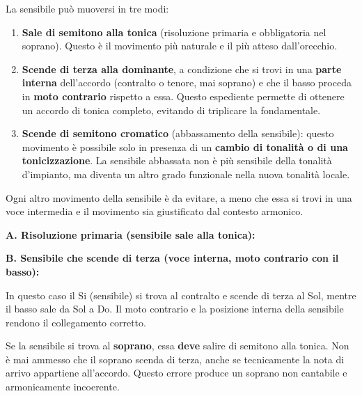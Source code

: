 \begin{regola}
	\label{reg:tre_movimenti_sensibile}
	La sensibile può muoversi in tre modi:
	\begin{enumerate}
		\item \textbf{Sale di semitono alla tonica} (risoluzione primaria e obbligatoria nel soprano). Questo è il movimento più naturale e il più atteso dall'orecchio.
		\item \textbf{Scende di terza alla dominante}, a condizione che si trovi in una \textbf{parte interna} dell'accordo (contralto o tenore, mai soprano) e che il basso proceda in \textbf{moto contrario} rispetto a essa. Questo espediente permette di ottenere un accordo di tonica completo, evitando di triplicare la fondamentale.
		\item \textbf{Scende di semitono cromatico} (abbassamento della sensibile): questo movimento è possibile solo in presenza di un \textbf{cambio di tonalità o di una tonicizzazione}. La sensibile abbassata non è più sensibile della tonalità d'impianto, ma diventa un altro grado funzionale nella nuova tonalità locale.
	\end{enumerate}
	Ogni altro movimento della sensibile è da evitare, a meno che essa si trovi in una voce intermedia e il movimento sia giustificato dal contesto armonico.
\end{regola}

\begin{esempio}
	\label{ex:risoluzioni_sensibile}

	\textbf{A. Risoluzione primaria (sensibile sale alla tonica):}

	\vspace{0.5cm}
	\textbf{B. Sensibile che scende di terza (voce interna, moto contrario con il basso):}

	In questo caso il Si (sensibile) si trova al contralto e scende di terza al Sol, mentre il basso sale da Sol a Do. Il moto contrario e la posizione interna della sensibile rendono il collegamento corretto.
\end{esempio}

\begin{errore}
	\label{err:sensibile_non_risolta}
	Se la sensibile si trova al \textbf{soprano}, essa \textbf{deve} salire di semitono alla tonica. Non è mai ammesso che il soprano scenda di terza, anche se tecnicamente la nota di arrivo appartiene all'accordo. Questo errore produce un soprano non cantabile e armonicamente incoerente.
\end{errore}

